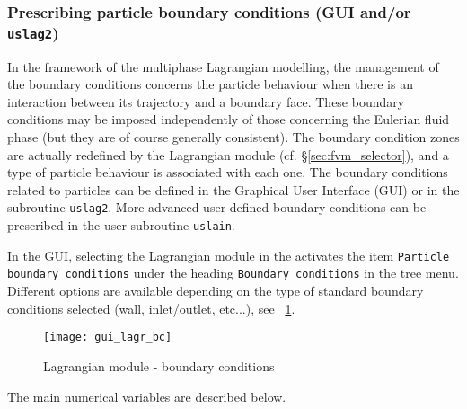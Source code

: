{{%
\subsubsection{Prescribing particle boundary conditions (GUI and/or \texttt{uslag2})}
In the framework of the multiphase Lagrangian modelling, the management of the boundary conditions concerns the particle behaviour when there is an interaction between its trajectory and a boundary face. These boundary conditions may be imposed independently of those concerning the Eulerian fluid phase (but they are of course generally consistent). The boundary condition zones are actually redefined by the Lagrangian module (cf. \S\ref{sec:fvm_selector}), and a type of particle behaviour is associated with each one. The boundary conditions related to particles can be defined in the Graphical User Interface (GUI) or in the subroutine \texttt{uslag2}. More advanced user-defined boundary conditions can be prescribed in the user-subroutine \texttt{uslain}.


 In the GUI, selecting the Lagrangian module in the activates the item \texttt{Particle boundary conditions} under the heading \texttt{Boundary conditions} in the tree menu. Different options are available depending on the type of standard boundary conditions selected (wall, inlet/outlet, etc...),
 see \figurename~\ref{fig:CL-Lag}.

\begin{figure}[ht]
\begin{center}
\texttt{[image: gui\_lagr\_bc]}
\caption{Lagrangian module - boundary conditions}
\label{fig:CL-Lag}
\end{center}
\end{figure}


The main numerical variables are described below.


}}
